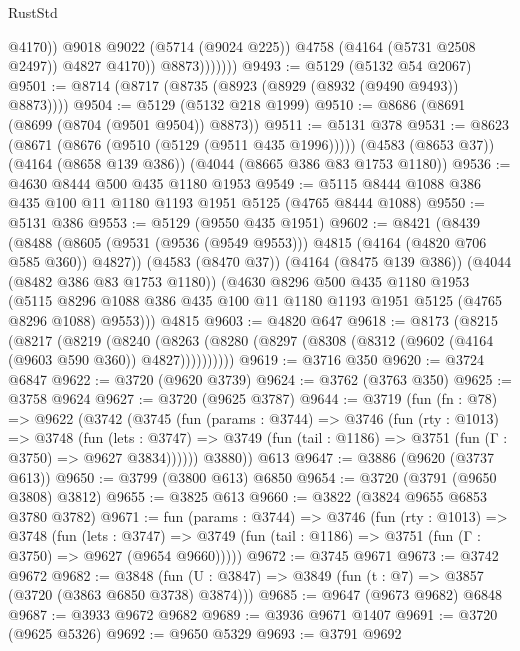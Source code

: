 \begin{lexlean}{RustStd}
\begin{coremodule}
                          @4170))
                      @9018
                      @9022
                      (@5714 (@9024 @225))
                      @4758
                      (@4164 (@5731 @2508 @2497))
                      @4827
                      @4170))
                  @8873)))))))
@9493 := @5129 (@5132 @54 @2067)
@9501 := @8714 (@8717 (@8735 (@8923 (@8929 (@8932 (@9490 @9493)) @8873))))
@9504 := @5129 (@5132 @218 @1999)
@9510 := @8686 (@8691 (@8699 (@8704 (@9501 @9504)) @8873))
@9511 := @5131 @378
@9531 := @8623
    (@8671 (@8676 (@9510 (@5129 (@9511 @435 @1996)))))
    (@4583 (@8653 @37))
    (@4164 (@8658 @139 @386))
    (@4044 (@8665 @386 @83 @1753 @1180))
@9536 := @4630 @8444 @500 @435 @1180 @1953
@9549 := @5115 @8444 @1088 @386 @435 @100 @11 @1180 @1193 @1951 @5125 (@4765 @8444 @1088)
@9550 := @5131 @386
@9553 := @5129 (@9550 @435 @1951)
@9602 := @8421
    (@8439
      (@8488 (@8605 (@9531 (@9536 (@9549 @9553))) @4815 (@4164 (@4820 @706 @585 @360)) @4827))
      (@4583 (@8470 @37))
      (@4164 (@8475 @139 @386))
      (@4044 (@8482 @386 @83 @1753 @1180))
      (@4630
        @8296
        @500
        @435
        @1180
        @1953
        (@5115 @8296 @1088 @386 @435 @100 @11 @1180 @1193 @1951 @5125 (@4765 @8296 @1088) @9553)))
    @4815
@9603 := @4820 @647
@9618 := @8173
    (@8215
      (@8217
        (@8219
          (@8240 (@8263 (@8280 (@8297 (@8308 (@8312 (@9602 (@4164 (@9603 @590 @360)) @4827))))))))))
@9619 := @3716 @350
@9620 := @3724 @6847
@9622 := @3720 (@9620 @3739)
@9624 := @3762 (@3763 @350)
@9625 := @3758 @9624
@9627 := @3720 (@9625 @3787)
@9644 := @3719
    (fun (fn : @78) =>
    @9622
      (@3742
        (@3745
          (fun (params : @3744) =>
          @3746
            (fun (rty : @1013) =>
            @3748
              (fun (lets : @3747) =>
              @3749 (fun (tail : @1186) => @3751 (fun (Γ : @3750) => @9627 @3834))))))
        @3880))
    @613
@9647 := @3886 (@9620 (@3737 @613))
@9650 := @3799 (@3800 @613) @6850
@9654 := @3720 (@3791 (@9650 @3808) @3812)
@9655 := @3825 @613
@9660 := @3822 (@3824 @9655 @6853 @3780 @3782)
@9671 := fun (params : @3744) =>
  @3746
    (fun (rty : @1013) =>
    @3748
      (fun (lets : @3747) =>
      @3749 (fun (tail : @1186) => @3751 (fun (Γ : @3750) => @9627 (@9654 @9660)))))
@9672 := @3745 @9671
@9673 := @3742 @9672
@9682 := @3848 (fun (U : @3847) => @3849 (fun (t : @7) => @3857 (@3720 (@3863 @6850 @3738) @3874)))
@9685 := @9647 (@9673 @9682) @6848
@9687 := @3933 @9672 @9682
@9689 := @3936 @9671 @1407
@9691 := @3720 (@9625 @5326)
@9692 := @9650 @5329
@9693 := @3791 @9692

\end{coremodule}
\end{lexlean}
